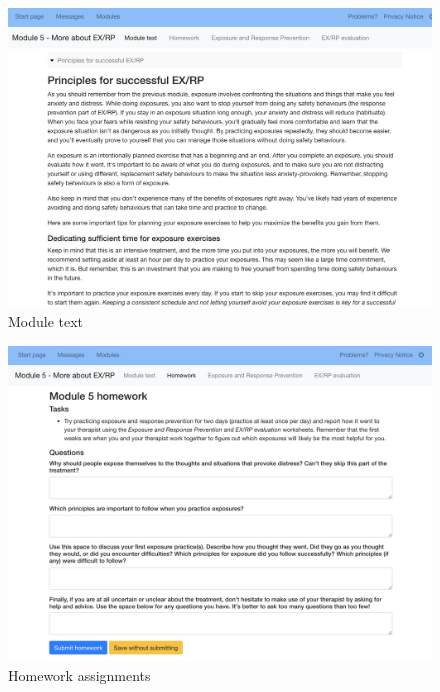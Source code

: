 \documentclass[]{book}
\begin{document}
\begin{figure}
\centering
\includegraphics{images/patient-moduletext.png}
\caption{Module text}
\end{figure}

\begin{figure}
\centering
\includegraphics{images/patient-homework.png}
\caption{Homework assignments}
\end{figure}
\end{document}
